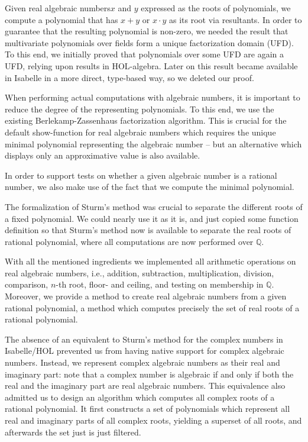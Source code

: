 \documentclass[11pt,a4paper]{article}
\newcommand\rats{\mathbb{Q}}
\newcommand\rais{real algebraic numbers\xspace}
\begin{document}
Given \rais $x$ and $y$ expressed as the roots of polynomials,
we compute a polynomial that has $x+y$ or $x \cdot y$ as its root via resultants.
In order to guarantee that the resulting polynomial is non-zero, we needed the result
that multivariate polynomials over fields form a unique factorization domain (UFD).
To this end, we initially proved that polynomials over some UFD are again a UFD, relying
upon results in HOL-algebra. Later on this result became available in Isabelle in a more
direct, type-based way, so we deleted our proof.

When performing actual computations with algebraic numbers, it is important to reduce
the degree of the representing polynomials. To this end, we use the existing
Berlekamp-Zassenhaus factorization algorithm. This is crucial for the default show-function for real 
algebraic numbers which requires the unique minimal polynomial representing the algebraic number --
but an alternative which displays only an approximative value is also available.

In order to support tests on whether a given algebraic number is a rational number, 
we also make use of the fact that we compute the minimal polynomial.

The formalization of Sturm's method \cite{Sturm-AFP} was crucial to separate the different
roots of a fixed polynomial. 
We could nearly use it as it is, and just copied some function definition so
that Sturm's method now is available to separate the real roots of rational polynomial, where
all computations are now performed over $\rats$.

With all the mentioned ingredients we implemented all arithmetic operations on real algebraic
numbers, i.e., addition, subtraction, multiplication, division, comparison, $n$-th root, floor-
and ceiling, and testing on membership in $\rats$. Moreover, we provide a method
to create real algebraic numbers from a given rational polynomial, a method which computes
precisely the set of real roots of a rational polynomial.

\medskip

The absence of an equivalent to Sturm's method for the complex numbers in Isabelle/HOL prevented
us from having native support for complex algebraic numbers. Instead, we represent complex
algebraic numbers as their real and imaginary part: note that a complex number is algebraic if
and only if both the real and the imaginary part are real algebraic numbers.
This equivalence also admitted us to design an algorithm which computes all complex roots
of a rational polynomial. It first constructs a set of polynomials which represent all
real and imaginary parts of all complex roots, yielding a superset of all roots,
and afterwards the set just is just filtered.
\end{document}
